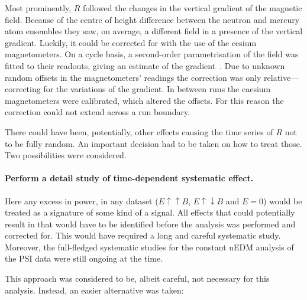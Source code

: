 Most prominently, $R$ followed the changes in the vertical gradient of the magnetic field. Because of the centre of height difference between the neutron and mercury atom ensembles they saw, on average, a different field in a presence of the vertical gradient.  Luckily, it could be corrected for with the use of the cesium magnetometers. On a cycle basis, a second-order parametrisation of the field was fitted to their readouts, giving an estimate of the gradient~\cite{Afach2014magmoment,WurstenThesis}. Due to unknown random offsets in the magnetometers' readings the correction was only relative---correcting for the variations of the gradient. In between runs the caesium magnetometers were calibrated, which altered the offsets. For this reason the correction could not extend across a run boundary. 

There could have been, potentially, other effects causing the time series of $R$ not to be fully random. An important decision had to be taken on how to treat those. Two possibilities were considered.

\paragraph{Perform a detail study of time-dependent systematic effect.}
Here any excess in power, in any dataset ($E \uparrow \uparrow B$, $E \uparrow \downarrow B$ and $E=0$) would be treated as a signature of some kind of a signal. All effects that could potentially result in that would have to be identified before the analysis was performed and corrected for. This would have required a long and careful systematic study. Moreover, the full-fledged systematic studies for the constant nEDM analysis of the PSI data were still ongoing at the time.

This approach was considered to be, albeit careful, not necessary for this analysis. Instead, an easier alternative was taken:


